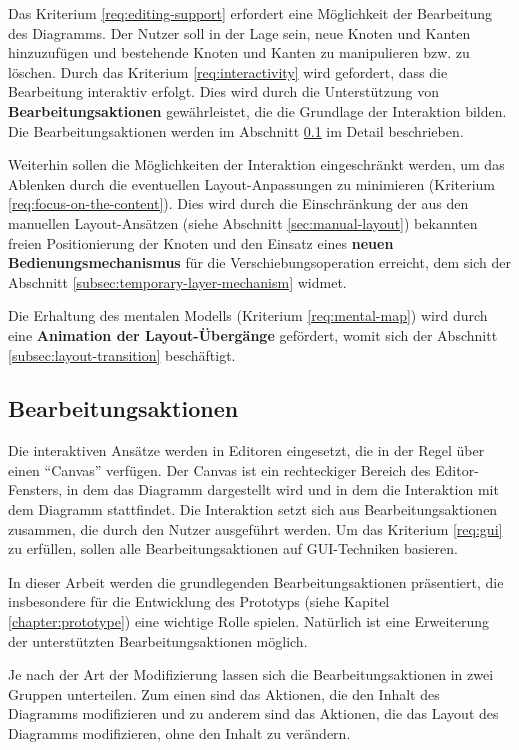 Das Kriterium \ref{req:editing-support} erfordert eine Möglichkeit der Bearbeitung des Diagramms. Der Nutzer soll in der Lage sein, neue Knoten und Kanten hinzuzufügen und bestehende Knoten und Kanten zu manipulieren bzw. zu löschen. Durch das Kriterium \ref{req:interactivity} wird gefordert, dass die Bearbeitung interaktiv erfolgt. Dies wird durch die Unterstützung von \textbf{Bearbeitungsaktionen} gewährleistet, die die Grundlage der Interaktion bilden. Die Bearbeitungsaktionen werden im Abschnitt \ref{subsec:edit-actions} im Detail beschrieben.

Weiterhin sollen die Möglichkeiten der Interaktion eingeschränkt werden, um das Ablenken durch die eventuellen Layout-Anpassungen zu minimieren (Kriterium \ref{req:focus-on-the-content}). Dies wird durch die Einschränkung der aus den manuellen Layout-Ansätzen (siehe Abschnitt \ref{sec:manual-layout}) bekannten freien Positionierung der Knoten und den Einsatz eines \textbf{neuen Bedienungsmechanismus} für die Verschiebungsoperation erreicht, dem sich der Abschnitt \ref{subsec:temporary-layer-mechanism} widmet.

Die Erhaltung des mentalen Modells (Kriterium \ref{req:mental-map}) wird durch eine \textbf{Animation der Layout-Übergänge} gefördert, womit sich der Abschnitt \ref{subsec:layout-transition} beschäftigt.

\subsection{Bearbeitungsaktionen}
\label{subsec:edit-actions}

Die interaktiven Ansätze werden in Editoren eingesetzt, die in der Regel über einen \enquote{Canvas} verfügen. Der Canvas ist ein rechteckiger Bereich des Editor-Fensters, in dem das Diagramm dargestellt wird und in dem die Interaktion mit dem Diagramm stattfindet. Die Interaktion setzt sich aus Bearbeitungsaktionen zusammen, die durch den Nutzer ausgeführt werden. Um das Kriterium \ref{req:gui} zu erfüllen, sollen alle Bearbeitungsaktionen auf GUI-Techniken basieren.

In dieser Arbeit werden die grundlegenden Bearbeitungsaktionen präsentiert, die insbesondere für die Entwicklung des Prototyps (siehe Kapitel \ref{chapter:prototype}) eine wichtige Rolle spielen. Natürlich ist eine Erweiterung der unterstützten Bearbeitungsaktionen möglich.

Je nach der Art der Modifizierung lassen sich die Bearbeitungsaktionen in zwei Gruppen unterteilen. Zum einen sind das Aktionen, die den Inhalt des Diagramms modifizieren und zu anderem sind das Aktionen, die das Layout des Diagramms modifizieren, ohne den Inhalt zu verändern.

